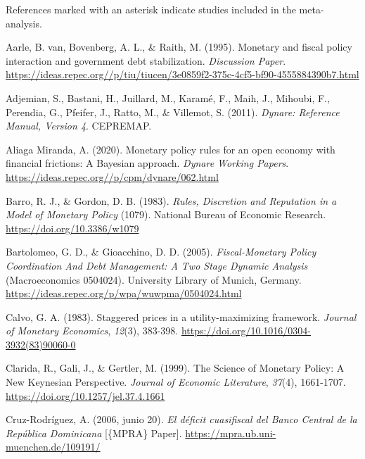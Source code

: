 \documentclass[
  man,
  longtable,
  nolmodern,
  notxfonts,
  notimes,
  colorlinks=true,linkcolor=blue,citecolor=blue,urlcolor=blue]{apa7}
\newlength{\cslhangindent}
\newenvironment{CSLReferences}[2] %
 {\begin{list}{}{%
  \setlength{\itemindent}{0pt}
  \setlength{\leftmargin}{0pt}
  \setlength{\parsep}{0pt}
  \ifodd #1
   \setlength{\leftmargin}{\cslhangindent}
   \setlength{\itemindent}{-1\cslhangindent}
  \fi
  \setlength{\itemsep}{#2\baselineskip}}}
 {\end{list}}
\begin{document}
References marked with an asterisk indicate studies included in the
meta-analysis.

\label{refs}
\begin{CSLReferences}{1}{0}
Aarle, B. van, Bovenberg, A. L., \& Raith, M. (1995). Monetary and
fiscal policy interaction and government debt stabilization.
\emph{Discussion Paper}.
\url{https://ideas.repec.org//p/tiu/tiucen/3e0859f2-375c-4cf5-bf90-4555884390b7.html}

Adjemian, S., Bastani, H., Juillard, M., Karamé, F., Maih, J., Mihoubi,
F., Perendia, G., Pfeifer, J., Ratto, M., \& Villemot, S. (2011).
\emph{Dynare: Reference Manual, Version 4}. {CEPREMAP}.

Aliaga Miranda, A. (2020). Monetary policy rules for an open economy
with financial frictions: A Bayesian approach. \emph{Dynare Working
Papers}. \url{https://ideas.repec.org//p/cpm/dynare/062.html}

Barro, R. J., \& Gordon, D. B. (1983). \emph{Rules, Discretion and
Reputation in a Model of Monetary Policy} (1079). National Bureau of
Economic Research. \url{https://doi.org/10.3386/w1079}

Bartolomeo, G. D., \& Gioacchino, D. D. (2005). \emph{Fiscal-Monetary
Policy Coordination And Debt Management: A Two Stage Dynamic Analysis}
(Macroeconomics 0504024). University Library of Munich, Germany.
\url{https://ideas.repec.org/p/wpa/wuwpma/0504024.html}

Calvo, G. A. (1983). Staggered prices in a utility-maximizing framework.
\emph{Journal of Monetary Economics}, \emph{12}(3), 383-398.
\url{https://doi.org/10.1016/0304-3932(83)90060-0}

Clarida, R., Gali, J., \& Gertler, M. (1999). The Science of Monetary
Policy: A New Keynesian Perspective. \emph{Journal of Economic
Literature}, \emph{37}(4), 1661-1707.
\url{https://doi.org/10.1257/jel.37.4.1661}

Cruz-Rodríguez, A. (2006, junio 20). \emph{El déficit cuasifiscal del
Banco Central de la República Dominicana} {[}\{MPRA\} Paper{]}.
\url{https://mpra.ub.uni-muenchen.de/109191/}


\end{CSLReferences}
\end{document}
